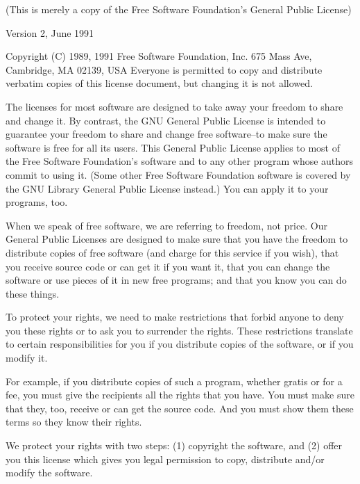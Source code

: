 
\vfill\eject%

(This is merely a copy of the Free Software Foundation's General Public
 License)

\centerline{Version 2, June 1991}

\fortran
 Copyright (C) 1989, 1991 Free Software Foundation, Inc.
                          675 Mass Ave, Cambridge, MA 02139, USA
 Everyone is permitted to copy and distribute verbatim copies
 of this license document, but changing it is not allowed.
\endfortran


  The licenses for most software are designed to take away your
freedom to share and change it.  By contrast, the GNU General Public
License is intended to guarantee your freedom to share and change free
software--to make sure the software is free for all its users.  This
General Public License applies to most of the Free Software
Foundation's software and to any other program whose authors commit to
using it.  (Some other Free Software Foundation software is covered by
the GNU Library General Public License instead.)  You can apply it to
your programs, too.

  When we speak of free software, we are referring to freedom, not
price.  Our General Public Licenses are designed to make sure that you
have the freedom to distribute copies of free software (and charge for
this service if you wish), that you receive source code or can get it
if you want it, that you can change the software or use pieces of it
in new free programs; and that you know you can do these things.

  To protect your rights, we need to make restrictions that forbid
anyone to deny you these rights or to ask you to surrender the rights.
These restrictions translate to certain responsibilities for you if you
distribute copies of the software, or if you modify it.

  For example, if you distribute copies of such a program, whether
gratis or for a fee, you must give the recipients all the rights that
you have.  You must make sure that they, too, receive or can get the
source code.  And you must show them these terms so they know their
rights.

  We protect your rights with two steps: (1) copyright the software, and
(2) offer you this license which gives you legal permission to copy,
distribute and/or modify the software.

